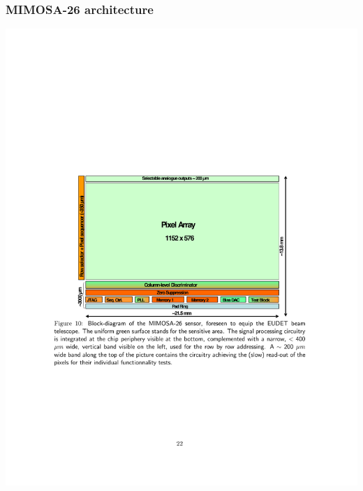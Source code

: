 \documentclass{beamer}
\begin{document}
  \begin{frame}[plain]
    \frametitle{MIMOSA-26 architecture}

    \begin{center}
      \includegraphics[width = \textwidth]{Pictures/mi26_architecture.pdf}
    \end{center}
  \end{frame}
\end{document}
